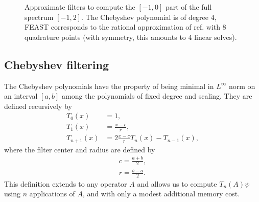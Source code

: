 \documentclass[11pt]{elsarticle}
\newcommand{\axisopt}{height = 10cm, width = 14cm}
\begin{document}

\begin{figure}[h!]
  \centering
  {
  }
  \caption{Approximate filters to compute the $[-1, 0]$ part of the
    full spectrum $[-1, 2]$. The Chebyshev polynomial is of degree 4,
    FEAST corresponds to the rational approximation of ref. \cite{polizzi}
    with 8 quadrature points (with symmetry, this amounts to 4 linear solves).}
  \label{fig:filters}
\end{figure}

\subsection{Chebyshev filtering}
The Chebyshev polynomials have the property of being minimal in
$L^{\infty}$ norm on an interval $[a, b]$ among the polynomials of fixed degree
and scaling. They are defined recursively by
\begin{align*}
  T_{0}(x) &= 1,\\
  T_{1}(x) &= \frac {x-c}r,\\
  T_{n+1}(x) &= 2 \frac {x-c}r T_{n}(x) - T_{n-1}(x),
\end{align*}
where the filter center and radius are defined by
\begin{align*}
  c = \frac {a+b}2,\\
  r = \frac {b-a}2.
\end{align*}
This definition extends to any operator $A$ and allows us to compute $T_{n}(A)
\psi$ using $n$ applications of $A$, and with only a modest additional
memory cost.
\end{document}
